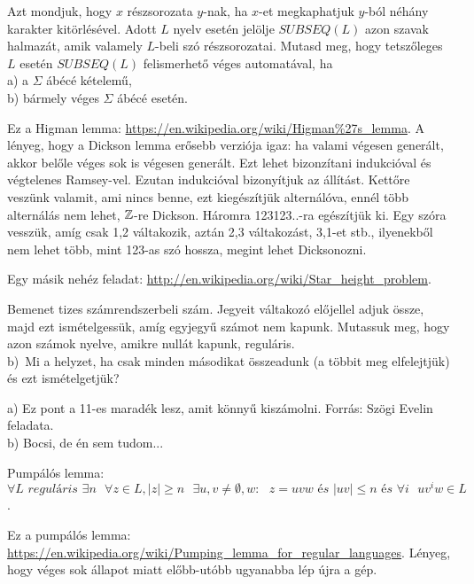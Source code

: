 \begin{Exercise}[counter={sorszam}, difficulty=2]
	 Azt mondjuk, hogy $x$ r\'eszsorozata $y$-nak, ha $x$-et megkaphatjuk $y$-b\'ol n\'eh\'any karakter kit\"orl\'es\'evel. Adott $L$ nyelv eset\'en jel\"olje $SUBSEQ(L)$ azon szavak halmaz\'at, amik valamely $L$-beli sz\'o r\'eszsorozatai. Mutasd meg, hogy tetsz\H oleges $L$ eset\'en $SUBSEQ(L)$ felismerhet\H o v\'eges automat\'aval, ha\\
a) a $\Sigma$ ábécé k\'etelem\H u,\\
b) b\'armely v\'eges $\Sigma$ ábécé eset\'en.
\end{Exercise}
\begin{Answer}
	Ez a Higman lemma: \url{https://en.wikipedia.org/wiki/Higman%27s_lemma}.
	A l\'enyeg, hogy a Dickson lemma er\H osebb verzi\'oja igaz: ha valami v\'egesen gener\'alt, akkor bel\H ole v\'eges sok is v\'egesen gener\'alt. Ezt lehet bizonz\'itani indukci\'oval \'es v\'egtelenes Ramsey-vel. Ezutan indukci\'oval bizony\'itjuk az \'all\'it\'ast. Kett\H ore vesz\"unk valamit, ami nincs benne, ezt kieg\'esz\'itj\"uk altern\'al\'ova, enn\'el t\"obb altern\'al\'as nem lehet, $\mathbb{Z}$-re Dickson. H\'aromra 123123..-ra eg\'esz\'itj\"uk ki. Egy sz\'ora vessz\"uk, am\'ig csak 1,2 v\'altakozik, azt\'an 2,3 v\'altakoz\'ast, 3,1-et stb., ilyenekb\H ol nem lehet t\"obb, mint 123-as sz\'o hossza, megint lehet Dicksonozni.
		
	Egy m\'asik neh\'ez feladat: \url{http://en.wikipedia.org/wiki/Star_height_problem}.	
\end{Answer}
%


\begin{Exercise}[counter={sorszam}, difficulty=0]
	Bemenet tizes sz\'amrendszerbeli sz\'am. Jegyeit v\'altakoz\'o el\H ojellel adjuk \"ossze, majd ezt ism\'etelgess\"uk, am\'ig egyjegy\H u sz\'amot nem kapunk. Mutassuk meg, hogy azon sz\'amok nyelve, amikre null\'at kapunk, regul\'aris.\\
b)~\veryhard Mi a helyzet, ha csak minden m\'asodikat \"osszeadunk (a t\"obbit meg elfelejtj\"uk) \'es ezt ism\'etelgetj\"uk?
\end{Exercise}
\begin{Answer}
	a) Ez pont a 11-es marad\'ek lesz, amit k\"onny\H u kisz\'amolni.
	Forr\'as: Sz\"ogi Evelin feladata.\\
	b) Bocsi, de \'en sem tudom...
\end{Answer}

\begin{Exercise}[counter={sorszam}, difficulty=0]
	Pumpálós lemma: $\forall L \textit{ reguláris } \exists n \textit{ } \forall z\in L, |z|\geq n \textit{ }\exists u,v\ne \emptyset,w:\textit{ } z=uvw \textit{ és } |uv|\leq n \textit{ és } \forall i\textit{ } uv^iw\in L$.
\end{Exercise}
\begin{Answer}
	Ez a pump\'al\'os lemma: \url{https://en.wikipedia.org/wiki/Pumping_lemma_for_regular_languages}.
	L\'enyeg, hogy v\'eges sok \'allapot miatt el\H obb-ut\'obb ugyanabba l\'ep \'ujra a g\'ep.
\end{Answer}

